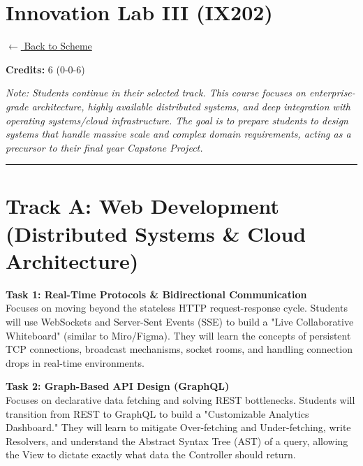 \section*{Innovation Lab III (IX202)}
\label{course:IX202}

\noindent \small{\hyperref[main:scheme]{$\leftarrow$ Back to Scheme}} \vspace{0.5cm}

\noindent \textbf{Credits:} 6 (0-0-6)

\noindent \textit{Note: Students continue in their selected track. This course focuses on enterprise-grade architecture, highly available distributed systems, and deep integration with operating systems/cloud infrastructure. The goal is to prepare students to design systems that handle massive scale and complex domain requirements, acting as a precursor to their final year Capstone Project.}

\vspace{0.5cm}
\hrule
\vspace{0.5cm}

\section*{Track A: Web Development (Distributed Systems \& Cloud Architecture)}

\noindent\textbf{Task 1: Real-Time Protocols \& Bidirectional Communication} \\
Focuses on moving beyond the stateless HTTP request-response cycle. Students will use WebSockets and Server-Sent Events (SSE) to build a "Live Collaborative Whiteboard" (similar to Miro/Figma). They will learn the concepts of persistent TCP connections, broadcast mechanisms, socket rooms, and handling connection drops in real-time environments.

\vspace{0.3cm}

\noindent\textbf{Task 2: Graph-Based API Design (GraphQL)} \\
Focuses on declarative data fetching and solving REST bottlenecks. Students will transition from REST to GraphQL to build a "Customizable Analytics Dashboard." They will learn to mitigate Over-fetching and Under-fetching, write Resolvers, and understand the Abstract Syntax Tree (AST) of a query, allowing the View to dictate exactly what data the Controller should return.

\vspace{0.3cm}

